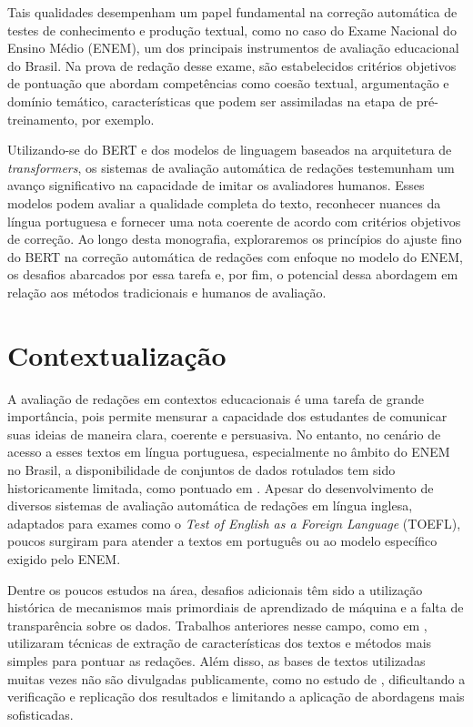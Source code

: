 Tais qualidades desempenham um papel fundamental na correção automática de testes de conhecimento e produção textual, como no caso do Exame Nacional do Ensino Médio (ENEM), um dos principais instrumentos de avaliação educacional do Brasil. Na prova de redação desse exame, são estabelecidos critérios objetivos de pontuação que abordam competências como coesão textual, argumentação e domínio temático, características que podem ser assimiladas na etapa de pré-treinamento, por exemplo.

Utilizando-se do BERT e dos modelos de linguagem baseados na arquitetura de \textit{transformers}, os sistemas de avaliação automática de redações testemunham um avanço significativo na capacidade de imitar os avaliadores humanos. Esses modelos podem avaliar a qualidade completa do texto, reconhecer nuances da língua portuguesa e fornecer uma nota coerente de acordo com critérios objetivos de correção. Ao longo desta monografia, exploraremos os princípios do ajuste fino do BERT na correção automática de redações com enfoque no modelo do ENEM, os desafios abarcados por essa tarefa e, por fim, o potencial dessa abordagem em relação aos métodos tradicionais e humanos de avaliação.

\section{Contextualização}

A avaliação de redações em contextos educacionais é uma tarefa de grande importância, pois permite mensurar a capacidade dos estudantes de comunicar suas ideias de maneira clara, coerente e persuasiva. No entanto, no cenário de acesso a esses textos em língua portuguesa, especialmente no âmbito do ENEM no Brasil, a disponibilidade de conjuntos de dados rotulados tem sido historicamente limitada, como pontuado em \cite{marinho-et-al-21}. Apesar do desenvolvimento de diversos sistemas de avaliação automática de redações em língua inglesa, adaptados para exames como o \textit{Test of English as a Foreign Language} (TOEFL), poucos surgiram para atender a textos em português ou ao modelo específico exigido pelo ENEM.

Dentre os poucos estudos na área, desafios adicionais têm sido a utilização histórica de mecanismos mais primordiais de aprendizado de máquina e a falta de transparência sobre os dados. Trabalhos anteriores nesse campo, como em \cite{amorim-et-al-2018}, utilizaram técnicas de extração de características dos textos e métodos mais simples para pontuar as redações. Além disso, as bases de textos utilizadas muitas vezes não são divulgadas publicamente, como no estudo de \cite{fonseca-et-al-2018}, dificultando a verificação e replicação dos resultados e limitando a aplicação de abordagens mais sofisticadas.

